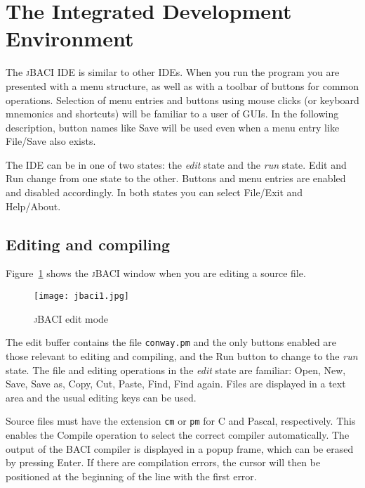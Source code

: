 \documentclass[11pt]{article}
\newcommand{\jb}{\textsc{\sffamily jBACI}}
\newcommand{\baci}{\textsc{\sffamily BACI}}
\newcommand{\p}[1]{\texttt{#1}}
\newcommand{\bu}[1]{\textsf{#1}}
\begin{document}
\newpage

\section{The Integrated Development Environment}

The \jb{} IDE is similar to other IDEs.
When you run the program you are presented with a menu structure,
as well as with a toolbar of buttons for common operations.
Selection of menu entries and buttons using mouse clicks
(or keyboard mnemonics and shortcuts) will be familiar to a user of GUIs.
In the following description, button names like \bu{Save}
will be used even when a menu entry like \bu{File/Save} also exists.

The IDE can be in one of two states: the \emph{edit}
state and the \emph{run} state.
\bu{Edit} and \bu{Run} change from one state to the other.
Buttons and menu entries are enabled and disabled accordingly.
In both states you can select \bu{File/Exit} and \bu{Help/About}.

\subsection{Editing and compiling}

Figure~\ref{fig.1} shows the \jb{} window
when you are editing a source file.
\begin{figure}[hb]
\begin{center}
\texttt{[image: jbaci1.jpg]}
\caption{\jb{} edit mode}\label{fig.1}
\end{center}
\end{figure}
The edit buffer contains the file \p{conway.pm} and the only buttons
enabled are those relevant to editing and compiling,
and the \bu{Run} button to change to the \emph{run} state.
The file and editing operations in the \emph{edit} state are familiar:
\bu{Open}, \bu{New}, \bu{Save}, \bu{Save as},
\bu{Copy}, \bu{Cut}, \bu{Paste}, \bu{Find}, \bu{Find again}.
Files are displayed in a text area and the usual editing keys
can be used.

Source files must have the extension \p{cm} or \p{pm}
for C and Pascal, respectively.
This enables the \bu{Compile} operation to select the correct
compiler automatically.
The output of the \baci{} compiler is displayed in a popup frame,
which can be erased by pressing \bu{Enter}.
If there are compilation errors, the cursor will then be positioned
at the beginning of the line with the first error.
\end{document}
